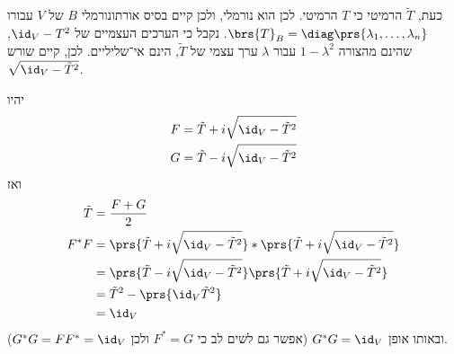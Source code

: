 \documentclass[a4paper,10pt,twoside,openany]{book}
\begin{document}
\begin{solution}
\begin{enumerate}
    כעת,
    $\tilde{T}$
    הרמיטי כי
    $T$
    הרמיטי. לכן הוא נורמלי, ולכן קיים בסיס אורתונורמלי
    $B$
    של
    $V$
    עבורו
    $\brs{T}_B = \diag\prs{\lambda_1, \ldots, \lambda_n}$.
    נקבל כי הערכים העצמיים של
    $\id_V - T^2$,
    שהינם מהצורה
    $1 - \lambda^2$
    עבור
    $\lambda$
    ערך עצמי של
    $\tilde{T}$,
    הינם אי־שליליים.
    לכן, קיים שורש
    $\sqrt{\id_V - \tilde{T}^2}$.
    
    יהיו
    \begin{align*}
        F &= \tilde{T} + i\sqrt{\id_V - \tilde{T}^2} \\
        G &= \tilde{T} - i\sqrt{\id_V - \tilde{T}^2}
    \end{align*}
    ואז
    \begin{align*}
        \tilde{T} &= \frac{F+G}{2} \\
        F^* F &= \prs{\tilde{T} + i\sqrt{\id_V - \tilde{T}^2}}* \prs{\tilde{T} + i\sqrt{\id_V - \tilde{T}^2}}
        \\&=
        \prs{\tilde{T} - i \sqrt{\id_V - \tilde{T}^2}}\prs{\tilde{T} + i\sqrt{\id_V - \tilde{T}^2}}
        \\&= \tilde{T}^2 - \prs{\id_V \tilde{T}^2}
        \\&= \id_V
    \end{align*}
    ובאותו אופן
    $G^* G = \id_V$
    (אפשר גם לשים לב כי
    $F^* = G$
    ולכן
    $G^* G = F F^* = \id_V$).
\end{enumerate}
\end{solution}



\end{document}
